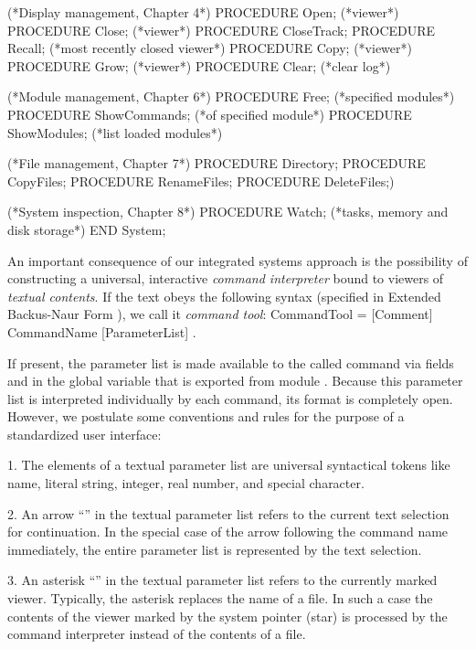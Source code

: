 (*Display management, Chapter 4*)
  PROCEDURE Open; (*viewer*)
  PROCEDURE Close; (*viewer*)
  PROCEDURE CloseTrack;
  PROCEDURE Recall; (*most recently closed viewer*)
  PROCEDURE Copy; (*viewer*)
  PROCEDURE Grow; (*viewer*)
  PROCEDURE Clear; (*clear log*)
  
(*Module management, Chapter 6*)
  PROCEDURE Free; (*specified modules*)
  PROCEDURE ShowCommands; (*of specified module*)
  PROCEDURE ShowModules; (*list loaded modules*)
  
(*File management, Chapter 7*)
  PROCEDURE Directory;
  PROCEDURE CopyFiles;
  PROCEDURE RenameFiles;
  PROCEDURE DeleteFiles;)
  
(*System inspection, Chapter 8*)
  PROCEDURE Watch; (*tasks, memory and disk storage*)
END System;
\endtt

\noindent An important consequence of our integrated systems approach is the
possibility of constructing a universal, interactive 
\emph{command interpreter} bound to viewers of \emph{textual contents}. If the text obeys
the following syntax (specified in Extended Backus-Naur Form ), we
call it \emph{command tool}:
\begintt
CommandTool = { [Comment] CommandName [ParameterList] }.
\endtt

\noindent If present, the parameter list is made available to the called command via fields  and  in the global variable  that is exported from module . Because this parameter list is interpreted individually by each command, its format is completely open. However, we postulate some conventions and rules for the purpose of a standardized user interface:

\item{1.} The elements of a textual parameter list are universal syntactical tokens like name, literal string, integer, real number, and special character.

\item{2.} An arrow ``\code{\^\/}'' in the textual parameter list refers to the current text selection for continuation. In the special case of the arrow following the command name immediately, the entire parameter list is represented by the text selection.

\item{3.} An asterisk ``\code{*}'' in the textual parameter list refers to the currently marked viewer. Typically, the asterisk replaces the name of a file. In such a case the contents of the viewer marked by the system pointer (star) is processed by the command interpreter instead of the contents of a file.

